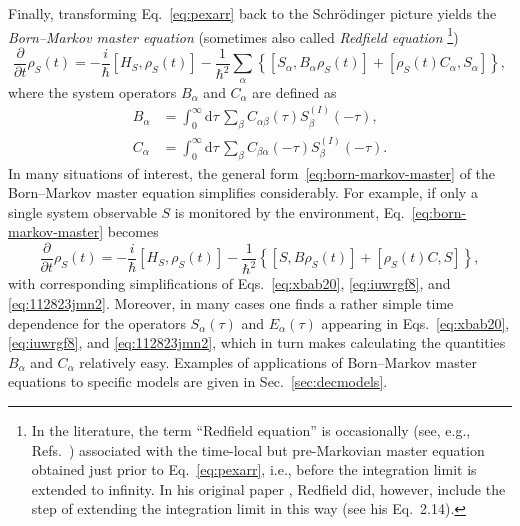 \documentclass[3p,sort&compress,12pt]{elsarticle}
\newcommand{\D}{\ensuremath{\mathrm{d}}}
\newcommand{\I}{\ensuremath{i}}
\newcommand{\op}[1]{#1}
\begin{document}
Finally, transforming Eq.~\eqref{eq:pexarr} back to the Schr\"odinger picture yields the \emph{Born--Markov master equation} (sometimes also called 
\emph{Redfield equation} \cite{Redfield:1957:im,Blum:1981:qq}\footnote{In the literature, the term  ``Redfield equation'' is occasionally (see, e.g., Refs.~\cite{Breuer:2002:oq,Hornberger:2009:aq}) associated with the time-local but pre-Markovian master equation obtained just prior to Eq.~\eqref{eq:pexarr}, i.e., before the integration limit is extended to infinity. In his original paper \cite{Redfield:1957:im}, Redfield did, however,  include the step of extending the integration limit in this way (see his Eq.~2.14).})
%
\begin{equation}
\label{eq:born-markov-master}
\frac{\partial}{\partial t} \op{\rho}_S(t) = -\frac{\I}{\hbar} \left[ \op{H}_S, \op{\rho}_S(t) \right] - \frac{1}{\hbar^2}\sum_{\alpha} \left\{ \left[
\op{S}_\alpha, B_\alpha \op{\rho}_S(t) \right] + \left[ \op{\rho}_S(t) C_\alpha, \op{S}_\alpha \right] \right\},
\end{equation}
%
where the system operators $B_\alpha$ and $C_\alpha$ are defined as
%
\begin{subequations} \label{eq:hvdwg643r5gsxkjcvbsvnx20}
\begin{align}
\label{eq:iuwrgf8}
B_\alpha &=\int_0^\infty \D \tau \, \sum_{\beta}
C_{\alpha\beta}(\tau)  S^{(I)}_\beta(-\tau),
\\ \label{eq:112823jmn2} C_\alpha &= \int_0^\infty \D \tau \,
\sum_{\beta} C_{\beta\alpha}(-\tau)  S^{(I)}_\beta(-\tau).
\end{align}
\end{subequations}
%
In many situations of interest, the general form~\eqref{eq:born-markov-master} of the Born--Markov master equation simplifies considerably. For example, if only a single system observable $S$ is monitored by the environment, Eq.~\eqref{eq:born-markov-master} becomes
%
\begin{equation}
\label{eq:born-markov-mastersim}
\frac{\partial}{\partial t} \op{\rho}_S(t) = -\frac{\I}{\hbar} \left[ \op{H}_S, \op{\rho}_S(t) \right] - \frac{1}{\hbar^2}\left\{\left[
\op{S}, B \op{\rho}_S(t) \right] + \left[ \op{\rho}_S(t) C, \op{S} \right]\right\},
\end{equation}
%
with corresponding simplifications of Eqs.~\eqref{eq:xbab20}, \eqref{eq:iuwrgf8}, and \eqref{eq:112823jmn2}. Moreover, in many cases one finds a rather simple time dependence for the operators $\op{S}_\alpha(\tau)$ and $E_\alpha(\tau)$ appearing in Eqs.~\eqref{eq:xbab20}, \eqref{eq:iuwrgf8}, and \eqref{eq:112823jmn2}, which in turn makes calculating the quantities $B_\alpha$ and $C_\alpha$ relatively easy. Examples of applications of Born--Markov master equations to specific models are given in Sec.~\ref{sec:decmodels}.
 
\end{document}
